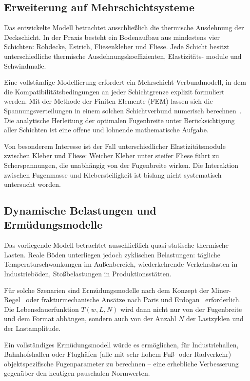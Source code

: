 ﻿\documentclass[a4paper,12pt]{article}
\theoremstyle{definition}
\begin{document}
\subsection{Erweiterung auf Mehrschichtsysteme}

Das entwickelte Modell betrachtet ausschließlich die thermische Ausdehnung
der Deckschicht. In der Praxis besteht ein Bodenaufbau aus mindestens
vier Schichten: Rohdecke, Estrich, Fliesenkleber und Fliese. Jede Schicht
besitzt unterschiedliche thermische Ausdehnungskoeffizienten, Elastizitäts-
module und Schwindmaße.

Eine vollständige Modellierung erfordert ein Mehrschicht-Verbundmodell,
in dem die Kompatibilitätsbedingungen an jeder Schichtgrenze explizit
formuliert werden. Mit der Methode der Finiten Elemente (FEM) lassen
sich die Spannungsverteilungen in einem solchen Schichtverbund numerisch
berechnen~\cite{zienkiewicz2000}. Die analytische Herleitung der optimalen
Fugenbreite unter Berücksichtigung aller Schichten ist eine offene
und lohnende mathematische Aufgabe.

Von besonderem Interesse ist der Fall unterschiedlicher Elastizitätsmodule
zwischen Kleber und Fliese: Weicher Kleber unter steifer Fliese führt zu
Scherspannungen, die unabhängig von der Fugenbreite wirken. Die Interaktion
zwischen Fugenmasse und Klebersteifigkeit ist bislang nicht systematisch
untersucht worden.

\subsection{Dynamische Belastungen und Ermüdungsmodelle}

Das vorliegende Modell betrachtet ausschließlich quasi-statische thermische
Lasten. Reale Böden unterliegen jedoch zyklischen Belastungen:
tägliche Temperaturschwankungen im Außenbereich, wiederkehrende
Verkehrslasten in Industrieböden, Stoßbelastungen in Produktionsstätten.

Für solche Szenarien sind Ermüdungsmodelle nach dem Konzept der
Miner-Regel~\cite{miner1945} oder frakturmechanische Ansätze
nach Paris und Erdogan~\cite{paris1963} erforderlich. Die
Lebensdauerfunktion $T(w, L, N)$ wird dann nicht nur von der
Fugenbreite und dem Format abhängen, sondern auch von der
Anzahl $N$ der Lastzyklen und der Lastamplitude.

Ein vollständiges Ermüdungsmodell würde es ermöglichen,
für Industriehallen, Bahnhofshallen oder Flughäfen (alle mit sehr
hohem Fuß- oder Radverkehr) objektspezifische Fugenparameter zu
berechnen -- eine erhebliche Verbesserung gegenüber den heutigen
pauschalen Normwerten.
\end{document}
